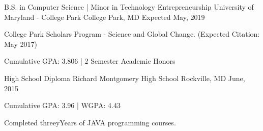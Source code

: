 

\begin{cventries}

  \cventry
    {B.S. in  Computer Science | Minor in Technology Entrepreneurship} %
    {University of Maryland - College Park} %
    {College Park, MD} %
    {Expected May, 2019} %
    {
      \begin{cvitems} %
        \item {College Park Scholars Program - Science and Global Change. (Expected Citation: May 2017)}
        \item {Cumulative GPA: 3.806 | 2 Semester Academic Honors}
      \end{cvitems}
    }


    \cventry
    {High School Diploma} %
    {Richard Montgomery High School} %
    {Rockville, MD} %
    {June, 2015} %
    {
      \begin{cvitems} %
        \item {Cumulative GPA: 3.96 | WGPA: 4.43}
        \item {Completed threeyYears of JAVA programming courses.}
      \end{cvitems}
    }

\end{cventries}
